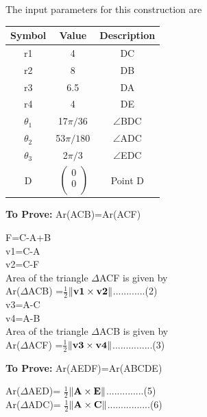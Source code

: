 \documentclass[10pt, a4paper]{article}
\newcommand{\myvec}[1]{\ensuremath{\begin{pmatrix}#1\end{pmatrix}}}
\let\vec\mathbf
\begin{document}
The input parameters for this construction are 
\begin{center}
\begin{tabular}{|c|c|c|}
	\hline
	\textbf{Symbol}&\textbf{Value}&\textbf{Description}\\
	\hline
	r1&4&DC\\
	\hline
	r2&8&DB\\
	\hline
	r3&6.5&DA\\
	\hline
	r4&4&DE\\
	\hline
	${\theta}_1$& 17$\pi/36$&$ \angle $BDC\\ 
	\hline
	${\theta}_2$& 53$\pi/180$&$ \angle $ADC\\ 
	\hline
	${\theta}_3$& 2$\pi/3$&$ \angle $EDC\\ 
	\hline
	D&$\
	\begin{pmatrix}
		0 \\
		0 \\
	\end{pmatrix}$%
	&Point D\\
	
	\hline
\end{tabular}
\end{center}
\textbf{To Prove:} Ar(ACB)=Ar(ACF)
		\begin{center}
	F=C-A+B\\
	v1=C-A\\
	v2=C-F\\
	Area of the triangle $\Delta$ACF is given by \\
Ar($\Delta$ACB) =$\frac{1}{2}$$\norm{\vec{v1}\times\vec{v2}}$............(2)\\
v3=A-C\\
	v4=A-B\\
		Area of the triangle $\Delta$ACB is given by \\
 Ar($\Delta$ACF) =$\frac{1}{2}$$\norm{\vec{v3}\times\vec{v4}}$...............(3)
	\end{center}
	\textbf{To Prove:}  Ar(AEDF)=Ar(ABCDE) 
	\begin{center}
	Ar($\Delta$AED)= 	$\frac{1}{2}$$\norm{\vec{A}\times\vec{E}}$..............(5)\\
	Ar($\Delta$ADC)= $\frac{1}{2}$$\norm{\vec{A}\times\vec{C}}$................(6)\\
	\end{center}
\end{document}
